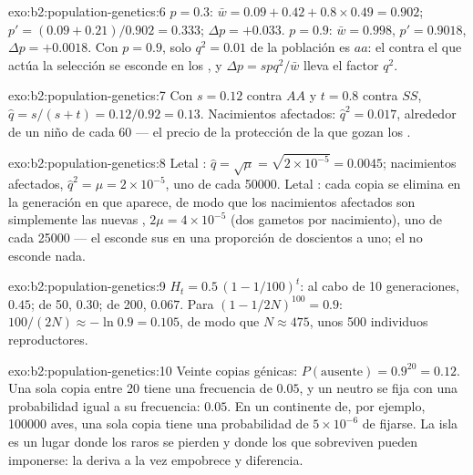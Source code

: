 \begin{solution}{exo:b2:population-genetics:6}
$p = 0.3$: $\bar w = 0.09 + 0.42 + 0.8\times 0.49 = 0.902$; $p' =
(0.09 + 0.21)/0.902 = 0.333$; $\Delta p = +0.033$. $p = 0.9$: $\bar w
= 0.998$, $p' = 0.9018$, $\Delta p = +0.0018$. Con $p = 0.9$, solo
$q^{2} = 0.01$ de la población es $aa$: el  contra el que actúa la
selección se esconde en los , y $\Delta p = spq^{2}/\bar w$
lleva el factor $q^{2}$.
\end{solution}

\begin{solution}{exo:b2:population-genetics:7}
Con $s = 0.12$ contra $AA$ y $t = 0.8$ contra $SS$, $\hat q =
s/(s + t) = 0.12/0.92 = 0.13$. Nacimientos afectados: $\hat q^{2} = 0.017$,
alrededor de un niño de cada 60 --- el precio de la protección de la que
gozan los .
\end{solution}

\begin{solution}{exo:b2:population-genetics:8}
Letal : $\hat q = \sqrt{\mu} = \sqrt{2\times 10^{-5}} =
0.0045$; nacimientos afectados, $\hat q^{2} = \mu = 2\times 10^{-5}$, uno
de cada \num{50000}. Letal : cada copia se elimina en la
generación en que aparece, de modo que los nacimientos afectados son
simplemente las nuevas , $2\mu = 4\times 10^{-5}$ (dos gametos
por nacimiento), uno de cada \num{25000} --- el  esconde sus
 en una proporción de doscientos a uno; el  no esconde
nada.
\end{solution}

\begin{solution}{exo:b2:population-genetics:9}
$H_t = 0.5\,(1 - 1/100)^{t}$: al cabo de 10 generaciones, $0.45$; de 50,
$0.30$; de 200, $0.067$. Para $(1 - 1/2N)^{100} = 0.9$:
$100/(2N) \approx -\ln 0.9 = 0.105$, de modo que $N \approx 475$, unos 500
individuos reproductores.
\end{solution}

\begin{solution}{exo:b2:population-genetics:10}
Veinte copias génicas: $P(\text{ausente}) = 0.9^{20} = 0.12$. Una sola
copia entre 20 tiene una frecuencia de $0.05$, y un  neutro se fija
con una probabilidad igual a su frecuencia: $0.05$. En un continente de,
por ejemplo, \num{100000} aves, una sola copia tiene una probabilidad de
$5\times 10^{-6}$ de fijarse. La isla es un lugar donde los  raros
se pierden y donde los que sobreviven pueden imponerse: la deriva a la vez
empobrece y diferencia.
\end{solution}

